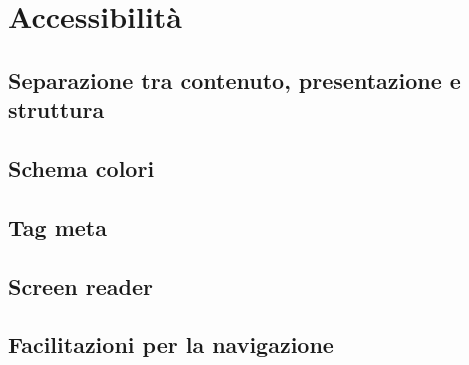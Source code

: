 \section{Accessibilità}

\subsection{Separazione tra contenuto, presentazione e struttura}

\subsection{Schema colori}

\subsection{Tag meta}

\subsection{Screen reader}

\subsection{Facilitazioni per la navigazione}

